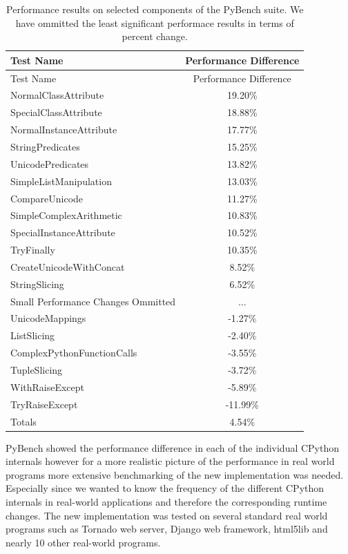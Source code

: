 \documentclass[11pt]{article}
\begin{document}
\begin{table}
  \caption{Performance results on selected components of the PyBench suite.  We
    have ommitted the least significant performace results in terms of percent
    change.
  }
\begin{tabular}{| l | c |}
  \hline
  \textbf{Test Name} & \textbf{Performance Difference} \\ \hline
  Test Name & Performance Difference \\ \hline
  NormalClassAttribute &  19.20\% \\ \hline
  SpecialClassAttribute &  18.88\% \\ \hline
  NormalInstanceAttribute &  17.77\% \\ \hline
  StringPredicates &  15.25\% \\ \hline
  UnicodePredicates &  13.82\% \\ \hline
  SimpleListManipulation &  13.03\% \\ \hline
  CompareUnicode &  11.27\% \\ \hline
  SimpleComplexArithmetic &  10.83\% \\ \hline
  SpecialInstanceAttribute &  10.52\% \\ \hline
  TryFinally &  10.35\% \\ \hline
  CreateUnicodeWithConcat &  8.52\% \\ \hline
  StringSlicing &  6.52\% \\ \hline
  Small Performance Changes Ommitted & ... \\ \hline
  UnicodeMappings &  -1.27\% \\ \hline
  ListSlicing &  -2.40\% \\ \hline
  ComplexPythonFunctionCalls &  -3.55\% \\ \hline
  TupleSlicing &  -3.72\% \\ \hline
  WithRaiseExcept &  -5.89\% \\ \hline
  TryRaiseExcept &  -11.99\% \\ \hline
  Totals & 4.54\% \\ \hline
\end{tabular}
\end{table}

PyBench showed the performance difference in each of the individual CPython internals however for a more realistic picture of the performance in real world programs more extensive benchmarking of the new implementation was needed. Especially since we wanted to know the frequency of the different CPython internals in real-world applications and therefore the corresponding runtime changes. The new implementation was tested on several standard real world programs such as Tornado web server, Django web framework, html5lib and nearly 10 other real-world programs. 
\end{document}

